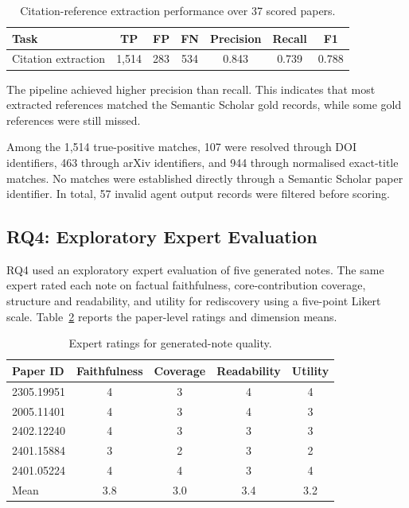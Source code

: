 \documentclass[runningheads]{llncs}
\begin{document}
\begin{table}[!htbp]
\centering
\caption{Citation-reference extraction performance over 37 scored papers.}
\label{tab:rq3_results}
\begin{tabular}{lcccccc}
\toprule
\textbf{Task} & \textbf{TP} & \textbf{FP} & \textbf{FN} & \textbf{Precision} & \textbf{Recall} & \textbf{F1} \\
\midrule
Citation extraction & 1,514 & 283 & 534 & 0.843 & 0.739 & 0.788 \\
\bottomrule
\end{tabular}
\end{table}

The pipeline achieved higher precision than recall. This
indicates that most extracted references matched the Semantic Scholar
gold records, while some gold references were still missed.

Among the 1,514 true-positive matches, 107 were resolved through DOI
identifiers, 463 through arXiv identifiers, and 944 through normalised
exact-title matches. No matches were established directly through a
Semantic Scholar paper identifier. In total, 57 invalid agent output
records were filtered before scoring.

\subsection{RQ4: Exploratory Expert Evaluation}
\label{sec:rq4_results}

RQ4 used an exploratory expert evaluation of five generated notes. The
same expert rated each note on factual faithfulness, core-contribution
coverage, structure and readability, and utility for rediscovery using a
five-point Likert scale. Table~\ref{tab:rq4_results} reports the
paper-level ratings and dimension means.

\begin{table}[!htbp]
\centering
\caption{Expert ratings for generated-note quality.}
\label{tab:rq4_results}
\begin{tabular}{lcccc}
\toprule
\textbf{Paper ID} & \textbf{Faithfulness} & \textbf{Coverage} & \textbf{Readability} & \textbf{Utility} \\
\midrule
2305.19951 & 4 & 3 & 4 & 4 \\
2005.11401 & 4 & 3 & 4 & 3 \\
2402.12240 & 4 & 3 & 3 & 3 \\
2401.15884 & 3 & 2 & 3 & 2 \\
2401.05224 & 4 & 4 & 3 & 4 \\
\midrule
Mean & 3.8 & 3.0 & 3.4 & 3.2 \\
\bottomrule
\end{tabular}
\end{table}
\end{document}
